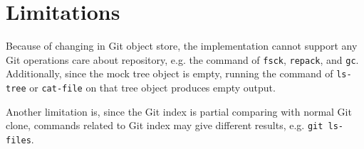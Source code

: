 \documentclass[preprint]{sigplanconf}
\begin{document}
\section{Limitations}
Because of changing in Git object store, the implementation cannot support
any Git operations care about repository, e.g. the command of \verb|fsck|,
\verb|repack|, and \verb|gc|.
Additionally, since the mock tree object is empty, running the command of
\verb|ls-tree| or \verb|cat-file| on that tree object produces empty output.

Another limitation is, since the Git index is partial comparing with normal Git
clone, commands related to Git index may give different results, e.g.
\verb|git ls-files|.





\begin{thebibliography}{10}
    \softraggedright


\end{thebibliography}
\end{document}
